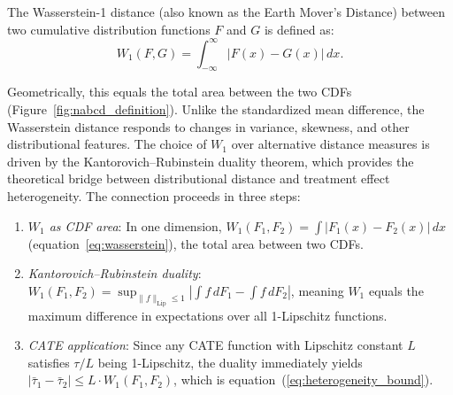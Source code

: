 \documentclass[AMA,Times1COL]{WileyNJDv5}
\begin{document}
The Wasserstein-1 distance (also known as the Earth Mover's Distance) between two cumulative distribution functions $F$ and $G$ is defined as:\cite{villani2009}
\begin{equation}
W_1(F, G) = \int_{-\infty}^{\infty} |F(x) - G(x)| \, dx.
\label{eq:wasserstein}
\end{equation}

Geometrically, this equals the total area between the two CDFs (Figure~\ref{fig:nabcd_definition}). Unlike the standardized mean difference, the Wasserstein distance responds to changes in variance, skewness, and other distributional features.\cite{panaretos2019} The choice of $W_1$ over alternative distance measures is driven by the Kantorovich--Rubinstein duality theorem,\cite{villani2009} which provides the theoretical bridge between distributional distance and treatment effect heterogeneity. The connection proceeds in three steps:
\begin{enumerate}[1.]
\item \emph{$W_1$ as CDF area}: In one dimension, $W_1(F_1, F_2) = \int |F_1(x) - F_2(x)| \, dx$ (equation~\ref{eq:wasserstein}), the total area between two CDFs.
\item \emph{Kantorovich--Rubinstein duality}: $W_1(F_1, F_2) = \sup_{\|f\|_{\text{Lip}} \leq 1} |\int f \, dF_1 - \int f \, dF_2|$, meaning $W_1$ equals the maximum difference in expectations over all 1-Lipschitz functions.\cite{villani2009}
\item \emph{CATE application}: Since any CATE function with Lipschitz constant $L$ satisfies $\tau/L$ being 1-Lipschitz, the duality immediately yields $|\bar{\tau}_1 - \bar{\tau}_2| \leq L \cdot W_1(F_1, F_2)$, which is equation~(\ref{eq:heterogeneity_bound}).
\end{enumerate}
\end{document}
